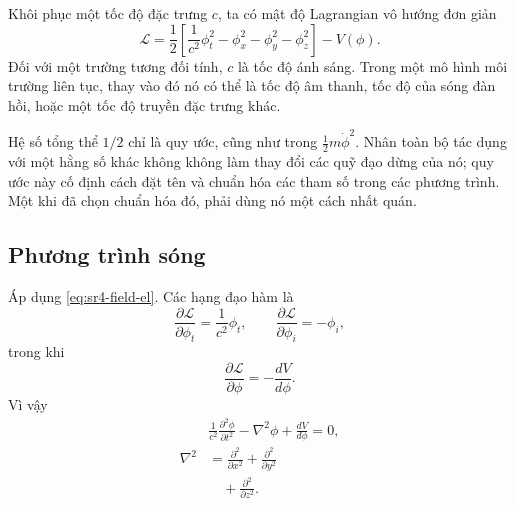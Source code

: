 Khôi phục một tốc độ đặc trưng \(c\), ta có mật độ Lagrangian vô hướng đơn giản
\begin{equation}
\boxed{
\mathcal{L}
=
\frac12
\left[
\frac{1}{c^2}\phi_t^2
-\phi_x^2-\phi_y^2-\phi_z^2
\right]
-V(\phi)
}.
\label{eq:sr4-scalar-lagrangian}
\end{equation}
Đối với một trường tương đối tính, \(c\) là tốc độ ánh sáng. Trong một mô hình môi trường liên tục, thay vào đó nó có thể là tốc độ âm thanh, tốc độ của sóng đàn hồi, hoặc một tốc độ truyền đặc trưng khác.

Hệ số tổng thể \(1/2\) chỉ là quy ước, cũng như trong
\(\tfrac12m\dot\phi^2\). Nhân toàn bộ tác dụng với một hằng số khác không không làm thay đổi các quỹ đạo dừng của nó; quy ước này cố định cách đặt tên và chuẩn hóa các tham số trong các phương trình. Một khi đã chọn chuẩn hóa đó, phải dùng nó một cách nhất quán.

\begin{classroomqa}
\end{classroomqa}

\subsection{Phương trình sóng}

Áp dụng \eqref{eq:sr4-field-el}. Các hạng đạo hàm là
\begin{equation}
\frac{\partial\mathcal{L}}{\partial\phi_t}
=\frac{1}{c^2}\phi_t,
\qquad
\frac{\partial\mathcal{L}}{\partial\phi_i}
=-\phi_i,
\end{equation}
trong khi
\begin{equation}
\frac{\partial\mathcal{L}}{\partial\phi}
=-\frac{dV}{d\phi}.
\end{equation}
Vì vậy
\begin{equation}
\begin{aligned}
&\boxed{
\frac{1}{c^2}\frac{\partial^2\phi}{\partial t^2}
-\nabla^2\phi
+\frac{dV}{d\phi}
=0
},\\[0.5em]
\nabla^2
&=
\frac{\partial^2}{\partial x^2}
+\frac{\partial^2}{\partial y^2}\\
&\quad
+\frac{\partial^2}{\partial z^2}.
\end{aligned}
\label{eq:sr4-general-scalar-eom}
\end{equation}

